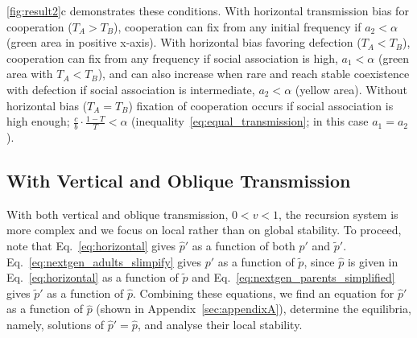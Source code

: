 \documentclass[12pt]{extarticle}
\begin{document}
{\autoref{fig:result2}c demonstrates these conditions.
With horizontal transmission bias for cooperation ($T_A>T_B$), cooperation can fix from any initial frequency if $a_2<\alpha$ (green area in positive x-axis). 
With horizontal bias favoring defection ($T_A<T_B$), cooperation can fix from any frequency if social association is high, $a_1<\alpha$ (green area with $T_A<T_B$), and can also increase when rare and reach stable coexistence with defection if social association is intermediate, $a_2<\alpha$ (yellow area).
Without horizontal bias ($T_A=T_B$) fixation of cooperation occurs if social association is high enough; $\frac{c}{b} \cdot \frac{1-T}{T} < \alpha$ (inequality~\ref{eq:equal_transmission}; in this case $a_1=a_2$).



\subsection*{With Vertical and Oblique Transmission}

With both vertical and oblique transmission, $0<v<1$, the recursion system is more complex
and we focus on local rather than on global stability.
To proceed,  note that 
Eq.\ \ref{eq:horizontal} gives $\hat{p}'$ as a function of both $p'$ and $\tilde{p}'$.
Eq.\ \ref{eq:nextgen_adults_slimpify} gives $p'$ as a function of $\tilde{p}$, since $\hat{p}$ is given in Eq.\ \ref{eq:horizontal} as a function of $\tilde{p}$ and 
Eq.\ \ref{eq:nextgen_parents_simplified} gives $\tilde{p}'$ as a function of $\hat{p}$. 
Combining these equations, we find an equation for $\hat{p}'$ as a function of $\hat{p}$ (shown in Appendix~\autoref{sec:appendixA}),
determine the equilibria, namely, solutions of $\hat{p}' = \hat{p}$, and analyse their local stability.

}
\end{document}

